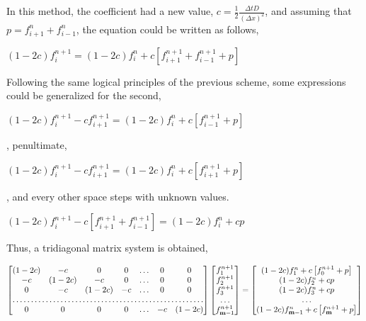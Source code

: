 \documentclass[12pt]{report}
\begin{document}
\par In this method, the coefficient had a new value, $c = \frac{1}{2}\frac{\Delta t D}{(\Delta x)^2}$, and assuming that $p = f_{i + 1}^{n} + f_{i - 1}^{n}$, the equation could be written as follows,

\begin{center}
\Large
$
(1 - 2c)f_i^{n + 1} = (1 - 2c)f_i^n + c \left[f_{i + 1}^{n + 1} + f_{i - 1}^{n + 1} + p\right]
$
\end{center}

\par Following the same logical principles of the previous scheme, 
some expressions could be generalized for the second,

\begin{center}
\Large
$
(1 - 2c)f_i^{n + 1} - c f_{i + 1}^{n + 1} = (1 - 2c)f_i^n + c \left[f_{i - 1}^{n + 1} + p\right]
$
\end{center}
, penultimate, 
\begin{center}
\Large
$
(1 - 2c)f_i^{n + 1} - c f_{i + 1}^{n + 1} = (1 - 2c)f_i^n + c \left[f_{i + 1}^{n + 1} + p\right]
$
\end{center}
, and every other space steps with unknown values.

\begin{center}
\Large
$
(1 - 2c)f_i^{n + 1} - c \left[f_{i + 1}^{n + 1} + f_{i - 1}^{n + 1}\right] = (1 - 2c)f_i^n + cp
$
\end{center}

\par Thus, a tridiagonal matrix system is obtained,

\begin{center}
\small
$
\begin{bmatrix}
    (1 - 2c) & -c & 0 & 0 & \dots & 0 & 0 \\
    -c & (1 - 2c) & -c & 0 & \dots & 0 & 0 \\
    0 & -c & (1 - 2c) & -c & \dots & 0 & 0 \\
    \hdotsfor{7} \\
    0 & 0 & 0 & 0 & \dots & -c & (1 - 2c) \\
\end{bmatrix}
\begin{bmatrix}
    f_1^{n + 1} \\
    f_2^{n + 1} \\
    f_3^{n + 1} \\
    \dots \\
    f_{\textbf{m} - 1}^{n + 1} \\
\end{bmatrix}
=
\begin{bmatrix}
    (1 - 2c)f_1^{n} + c \left[f_0^{n + 1} + p\right] \\
    (1 - 2c)f_2^{n} + cp \\
    (1 - 2c)f_3^{n} + cp\\
    \dots \\
    (1 - 2c)f_{\textbf{m} - 1}^{n} + c \left[f_{\textbf{m}}^{n + 1} + p\right] \\
\end{bmatrix}
$
\end{center}
\end{document}

